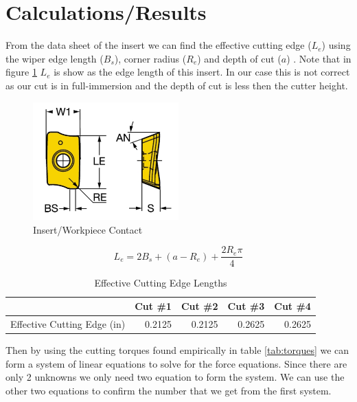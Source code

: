\documentclass[12pt]{article}
\begin{document}
\section{Calculations/Results}
From the data sheet of the insert we can find the effective cutting edge ($L_e$) using the wiper edge length ($B_s$), corner radius ($R_e$) and depth of cut ($a$) . Note that in figure \ref{fig:insertfig} $L_e$ is show as the edge length of this insert. In our case this is not correct as our cut is in full-immersion and the depth of cut is less then the cutter height.

\begin{figure}[h!]
    \centering
    \includegraphics[width=0.5\textwidth]{insert.png}
    \caption{Insert/Workpiece Contact}
    \label{fig:insertfig}
\end{figure}

\begin{equation}
    L_e=2B_s + (a-R_e) + \frac{2R_e\pi}{4}
\end{equation}

\begin{table}[htbp]
  \centering
  \caption{Effective Cutting Edge Lengths}
    \begin{tabular}{|l|rrrr|}
    \hline
          & \multicolumn{1}{l}{Cut \#1} & \multicolumn{1}{l}{Cut \#2} & \multicolumn{1}{l}{Cut \#3 } & \multicolumn{1}{l|}{Cut \#4} \\
    \hline
    Effective Cutting Edge (in) & 0.2125 & 0.2125 & 0.2625 & 0.2625 \\
    \hline
    \end{tabular}%
  \label{tab:Le}%
\end{table}%

Then by using the cutting torques found empirically in table \ref{tab:torques} we can form a system of linear equations to solve for the force equations. Since there are only 2 unknowns we only need two equation to form the system. We can use the other two equations to confirm the number that we get from the first system.
\end{document}
